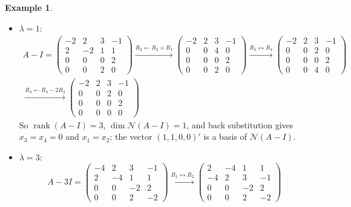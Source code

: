 \documentclass[12pt]{article}
\DeclareMathOperator{\rank}{rank}
\theoremstyle{definition}
\newtheorem{example}[theorem]{Example}
\begin{document}
\begin{example}
\begin{itemize}
\[\xrightarrow[R_4\leftarrow R_4-R_3]{R_1\leftrightarrow R_2}
\begin{pmatrix}2&0&1&1\\0&2&3&-1\\0&0&2&2\\0&0&0&0\end{pmatrix}
\]
Again \(\rank(A+I)=3\) and \(\dim\mathcal N(A+I)=1\). With \(x_4=1\), back substitution gives \(x_3=-1\), \(x_2=2\)
and \(x_1=0\); so \((0,2,-1,1)'\) is a basis of \(\mathcal N(A+I)\).
\item \(\lambda=1\):
\[
\begin{gathered}
A-I=\begin{pmatrix}-2&2&3&-1\\2&-2&1&1\\0&0&0&2\\0&0&2&0\end{pmatrix}
\xrightarrow{R_2\leftarrow R_2+R_1}
\begin{pmatrix}-2&2&3&-1\\0&0&4&0\\0&0&0&2\\0&0&2&0\end{pmatrix}
\xrightarrow{R_2\leftrightarrow R_4}
\begin{pmatrix}-2&2&3&-1\\0&0&2&0\\0&0&0&2\\0&0&4&0\end{pmatrix}
\\
\xrightarrow{R_4\leftarrow R_4-2R_2}
\begin{pmatrix}-2&2&3&-1\\0&0&2&0\\0&0&0&2\\0&0&0&0\end{pmatrix}
\end{gathered}
\]
So \(\rank(A-I)=3\), \(\dim\mathcal N(A-I)=1\), and back substitution gives \(x_3=x_4=0\) and \(x_1=x_2\): the vector
\((1,1,0,0)'\) is a basis of \(\mathcal N(A-I)\).
\item \(\lambda=3\):
\[
A-3I=\begin{pmatrix}-4&2&3&-1\\2&-4&1&1\\0&0&-2&2\\0&0&2&-2\end{pmatrix}
\xrightarrow{R_1\leftrightarrow R_2}
\begin{pmatrix}2&-4&1&1\\-4&2&3&-1\\0&0&-2&2\\0&0&2&-2\end{pmatrix}
\]
\end{itemize}
\end{example}
\end{document}
